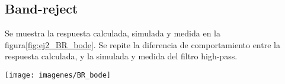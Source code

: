 \subsection{Band-reject}

Se muestra la respuesta calculada, simulada y medida en la figura\ref{fig:ej2_BR_bode}. Se repite la diferencia de comportamiento entre la respuesta calculada, y la simulada y medida del filtro high-pass. 
\begin{figure*}
	\texttt{[image: imagenes/BR\_bode]}
	\caption{Respuesta en frecuencia del filtro band-reject calculada, simulada, y medida}
		\label{fig:ej2_BR_bode}

\end{figure*}


